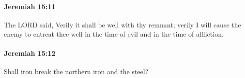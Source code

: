 		\paragraph{Jeremiah 15:11} %
			\label{JEREMIAH-15-11}

			The LORD said, Verily it shall be well with thy remnant; verily I will cause the enemy to entreat thee well in the time of evil and in the time of affliction.


		\paragraph{Jeremiah 15:12} %
			\label{JEREMIAH-15-12}

			Shall iron break the northern iron and the steel?


